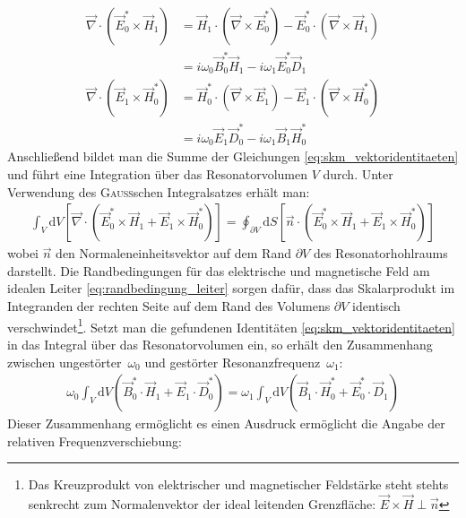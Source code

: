 \documentclass[11pt, a4paper]{scrbook}
\newcommand{\vnabla}{\vec{\nabla}}
\newcommand{\ve}{\vec{E}}
\newcommand{\vb}{\vec{B}}
\newcommand{\vh}{\vec{H}}
\newcommand{\vd}{\vec{D}}
\begin{document}
	\begin{subequations}
		\label{eq:skm_vektoridentitaeten}
		\begin{align}
		\vnabla \cdot \left( \ve_0^* \times \vh_1\right) &= \vh_1 \cdot \left( \vnabla \times \ve_0^* \right) - \ve_0^* \cdot \left( \vnabla \times \vh_1 \right) \nonumber \\
		&= i \omega_0 \vb_0^* \vh_1 - i \omega_1 \ve_0^* \vd_1 \label{eq:e0h1} \\[0.5em]
		\vnabla \cdot \left( \ve_1 \times \vh_0^* \right) &= \vh_0^* \cdot \left( \vnabla \times \ve_1 \right) - \ve_1 \cdot \left( \vnabla \times \vh_0^* \right) \nonumber \\
		&= i \omega_0 \ve_1 \vd_0^* - i \omega_1 \vb_1 \vh_0^* \label{eq:e1h0}
		\end{align}
	\end{subequations}
	Anschließend bildet man die Summe der Gleichungen \eqref{eq:skm_vektoridentitaeten} und führt eine Integration über das Resonatorvolumen $V$ durch.
	Unter Verwendung des \textsc{Gauß}schen Integralsatzes erhält man:
	\begin{align}
		\int_{V} \mathrm{d}V \left[ \vnabla \cdot \left( \ve_0^* \times \vh_1 + \ve_1 \times \vh_0^* \right) \right] = \oint_{\partial V} \mathrm{d}S \left[ \vec{n} \cdot \left( \ve_0^* \times \vh_1 + \ve_1 \times \vh_0^* \right)\right] \label{eq:volint}
	\end{align}
	wobei $\vec{n}$ den Normaleneinheitsvektor auf dem Rand $\partial V$ des Resonatorhohlraums darstellt.
	Die Randbedingungen für das elektrische und magnetische Feld am idealen Leiter \eqref{eq:randbedingung_leiter} sorgen dafür, dass das Skalarprodukt im Integranden der rechten Seite auf dem Rand des Volumens $\partial V$ identisch verschwindet\footnote{Das Kreuzprodukt von elektrischer und magnetischer Feldstärke steht stehts senkrecht zum Normalenvektor der ideal leitenden Grenzfläche: $\ve \times \vh \perp \vec{n}$}.
	Setzt man die gefundenen Identitäten \eqref{eq:skm_vektoridentitaeten} in das Integral über das Resonatorvolumen ein, so erhält den Zusammenhang zwischen ungestörter~$\omega_0$ und gestörter Resonanzfrequenz~$\omega_1$:
	\begin{align}
		\omega_0 \int_{V} \mathrm{d}V \left( \vb_0^* \cdot \vh_1 + \ve_1 \cdot \vd_0^* \right) = \omega_1 \int_{V} \mathrm{d}V \left( \vb_1 \cdot \vh_0^* + \ve_0^* \cdot \vd_1 \right)
	\end{align}
	Dieser Zusammenhang ermöglicht es einen Ausdruck ermöglicht die Angabe der relativen Frequenzverschiebung:
\end{document}
